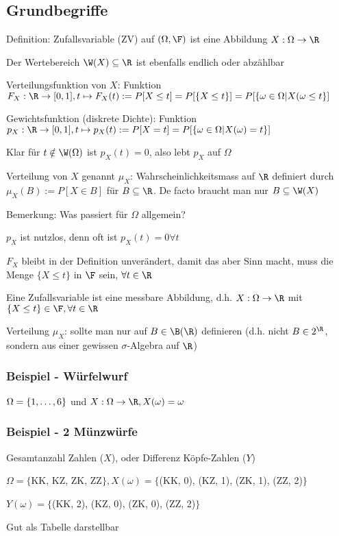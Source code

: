 \subsection{Grundbegriffe}
\enumstart
	\item Definition: Zufallsvariable (ZV) auf $(\Omega, \F)$ ist eine Abbildung $X: \Omega \rightarrow \R$
	\item Der Wertebereich $\W(X) \subseteq \R$ ist ebenfalls endlich oder abzählbar
	\item Verteilungsfunktion von $X$: Funktion $F_X: \R \rightarrow [0,1], t\mapsto F_X(t) := P[X \le t] = P[\{X \le t\}] = P[\{\omega \in \Omega | X(\omega \le t\}]$
	\item Gewichtsfunktion (diskrete Dichte): Funktion $p_X: \R \rightarrow [0,1], t \mapsto p_X(t) := P[X = t] = P[\{\omega \in \Omega | X(\omega) = t\}]$
	\item Klar für $t \notin \W(\Omega)$ ist $p_X(t) = 0$, also lebt $p_X$ auf $\Omega$
	\item Verteilung von $X$ genannt $\mu_X$: Wahrscheinlichkeitsmass auf $\R$ definiert durch $\mu_X(B) := P[X \in B]$ für $B \subseteq \R$. De facto braucht man nur $B \subseteq \W(X)$
	\item Bemerkung: Was passiert für $\Omega$ allgemein?
	\enumstart
		\item $p_X$ ist nutzlos, denn oft ist $p_X(t) = 0 \forall t$
		\item $F_X$ bleibt in der Definition unverändert, damit das aber Sinn macht, muss die Menge $\{X \le t\}$ in $\F$ sein, $\forall t \in \R$
		\item Eine Zufallsvariable ist eine messbare Abbildung, d.h. $X: \Omega \rightarrow \R$ mit $\{X \le t\} \in \F, \forall t \in \R$
		\item Verteilung $\mu_X$: sollte man nur auf $B \in \B(\R)$ definieren (d.h. nicht $B \in 2^\R$, sondern aus einer gewissen $\sigma$-Algebra auf $\R$)
	\enumend
\enumend

\subsubsection{Beispiel - Würfelwurf}
\enumstart
	\item $\Omega = \{1, \mathellipsis, 6\}$ und $X: \Omega \rightarrow \R, X(\omega) = \omega$
\enumend

\subsubsection{Beispiel - 2 Münzwürfe}
\enumstart
	\item Gesamtanzahl Zahlen ($X$), oder Differenz Köpfe-Zahlen ($Y$)
	\item $\Omega = \{$KK, KZ, ZK, ZZ$\}, X(\omega) = \{$(KK, 0), (KZ, 1), (ZK, 1), (ZZ, 2)$\}$
	\item $Y(\omega) = \{$(KK, 2), (KZ, 0), (ZK, 0), (ZZ, 2)$\}$
	\item Gut als Tabelle darstellbar
\enumend

